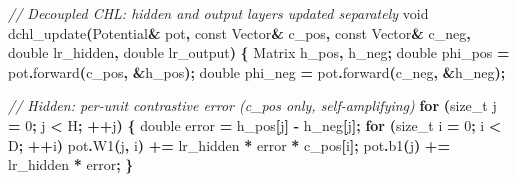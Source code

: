 \documentclass[
  11pt,
  a4paper,
]{article}
\newenvironment{Shaded}{\begin{snugshade}}{\end{snugshade}}
\newcommand{\AttributeTok}[1]{\textcolor[rgb]{0.13,0.29,0.53}{#1}}
\newcommand{\CommentTok}[1]{\textcolor[rgb]{0.56,0.35,0.01}{\textit{#1}}}
\newcommand{\ControlFlowTok}[1]{\textcolor[rgb]{0.13,0.29,0.53}{\textbf{#1}}}
\newcommand{\DataTypeTok}[1]{\textcolor[rgb]{0.13,0.29,0.53}{#1}}
\newcommand{\DecValTok}[1]{\textcolor[rgb]{0.00,0.00,0.81}{#1}}
\newcommand{\NormalTok}[1]{#1}
\newcommand{\OperatorTok}[1]{\textcolor[rgb]{0.81,0.36,0.00}{\textbf{#1}}}
\begin{document}
\begin{Shaded}
\begin{Highlighting}[]
\CommentTok{// Decoupled CHL: hidden and output layers updated separately}
\DataTypeTok{void}\NormalTok{ dchl\_update}\OperatorTok{(}\NormalTok{Potential}\OperatorTok{\&}\NormalTok{ pot}\OperatorTok{,} \AttributeTok{const}\NormalTok{ Vector}\OperatorTok{\&}\NormalTok{ c\_pos}\OperatorTok{,} \AttributeTok{const}\NormalTok{ Vector}\OperatorTok{\&}\NormalTok{ c\_neg}\OperatorTok{,}
                 \DataTypeTok{double}\NormalTok{ lr\_hidden}\OperatorTok{,} \DataTypeTok{double}\NormalTok{ lr\_output}\OperatorTok{)} \OperatorTok{\{}
\NormalTok{    Matrix h\_pos}\OperatorTok{,}\NormalTok{ h\_neg}\OperatorTok{;}
    \DataTypeTok{double}\NormalTok{ phi\_pos }\OperatorTok{=}\NormalTok{ pot}\OperatorTok{.}\NormalTok{forward}\OperatorTok{(}\NormalTok{c\_pos}\OperatorTok{,} \OperatorTok{\&}\NormalTok{h\_pos}\OperatorTok{);}
    \DataTypeTok{double}\NormalTok{ phi\_neg }\OperatorTok{=}\NormalTok{ pot}\OperatorTok{.}\NormalTok{forward}\OperatorTok{(}\NormalTok{c\_neg}\OperatorTok{,} \OperatorTok{\&}\NormalTok{h\_neg}\OperatorTok{);}

    \CommentTok{// Hidden: per{-}unit contrastive error (c\_pos only, self{-}amplifying)}
    \ControlFlowTok{for} \OperatorTok{(}\DataTypeTok{size\_t}\NormalTok{ j }\OperatorTok{=} \DecValTok{0}\OperatorTok{;}\NormalTok{ j }\OperatorTok{\textless{}}\NormalTok{ H}\OperatorTok{;} \OperatorTok{++}\NormalTok{j}\OperatorTok{)} \OperatorTok{\{}
        \DataTypeTok{double}\NormalTok{ error }\OperatorTok{=}\NormalTok{ h\_pos}\OperatorTok{[}\NormalTok{j}\OperatorTok{]} \OperatorTok{{-}}\NormalTok{ h\_neg}\OperatorTok{[}\NormalTok{j}\OperatorTok{];}
        \ControlFlowTok{for} \OperatorTok{(}\DataTypeTok{size\_t}\NormalTok{ i }\OperatorTok{=} \DecValTok{0}\OperatorTok{;}\NormalTok{ i }\OperatorTok{\textless{}}\NormalTok{ D}\OperatorTok{;} \OperatorTok{++}\NormalTok{i}\OperatorTok{)}
\NormalTok{            pot}\OperatorTok{.}\NormalTok{W1}\OperatorTok{(}\NormalTok{j}\OperatorTok{,}\NormalTok{ i}\OperatorTok{)} \OperatorTok{+=}\NormalTok{ lr\_hidden }\OperatorTok{*}\NormalTok{ error }\OperatorTok{*}\NormalTok{ c\_pos}\OperatorTok{[}\NormalTok{i}\OperatorTok{];}
\NormalTok{        pot}\OperatorTok{.}\NormalTok{b1}\OperatorTok{(}\NormalTok{j}\OperatorTok{)} \OperatorTok{+=}\NormalTok{ lr\_hidden }\OperatorTok{*}\NormalTok{ error}\OperatorTok{;}
    \OperatorTok{\}}


\end{Highlighting}
\end{Shaded}
\end{document}
